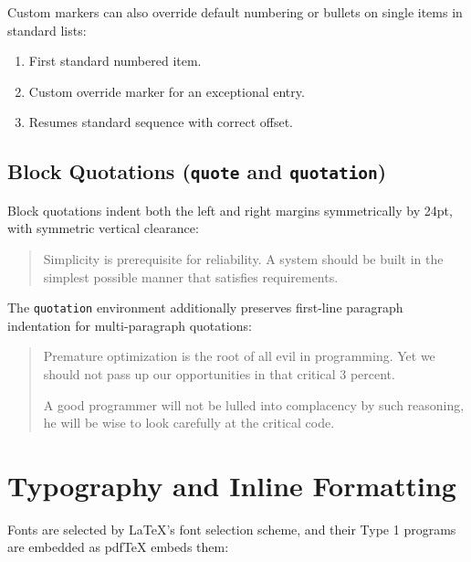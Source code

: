 \documentclass[11pt, a4paper]{article}
\begin{document}
Custom markers can also override default numbering or bullets on single items in standard lists:

\begin{enumerate}
\item First standard numbered item.
\item[(X)] Custom override marker for an exceptional entry.
\item Resumes standard sequence with correct offset.
\end{enumerate}

\subsection{Block Quotations (\texttt{quote} and \texttt{quotation})}
Block quotations indent both the left and right margins symmetrically by 24pt, with symmetric vertical clearance:

\begin{quote}
Simplicity is prerequisite for reliability. A system should be built in the simplest possible manner that satisfies requirements.
\end{quote}

The \texttt{quotation} environment additionally preserves first-line paragraph indentation for multi-paragraph quotations:

\begin{quotation}
Premature optimization is the root of all evil in programming. Yet we should not pass up our opportunities in that critical 3 percent.

A good programmer will not be lulled into complacency by such reasoning, he will be wise to look carefully at the critical code.
\end{quotation}

\newpage

\section{Typography and Inline Formatting}
Fonts are selected by LaTeX's font selection scheme, and their Type 1 programs are embedded as pdfTeX embeds them:
\end{document}
